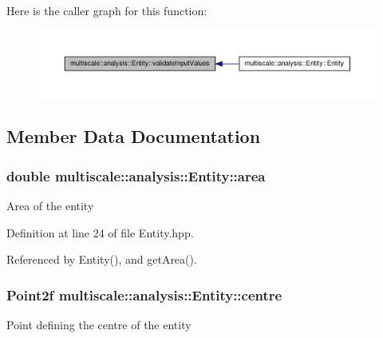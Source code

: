 \-Here is the caller graph for this function\-:\nopagebreak
\begin{figure}[H]
\begin{center}
\leavevmode
\includegraphics[width=350pt]{classmultiscale_1_1analysis_1_1Entity_afd09bf78874eb411c0940713948c4891_icgraph}
\end{center}
\end{figure}




\subsection{\-Member \-Data \-Documentation}
\hypertarget{classmultiscale_1_1analysis_1_1Entity_a7fad3c67bb46cc0f4ce1fb17ef3e66cc}{
\subsubsection[{area}]{\setlength{\rightskip}{0pt plus 5cm}double {\bf multiscale\-::analysis\-::\-Entity\-::area}}}\label{classmultiscale_1_1analysis_1_1Entity_a7fad3c67bb46cc0f4ce1fb17ef3e66cc}
\-Area of the entity 

\-Definition at line 24 of file \-Entity.\-hpp.



\-Referenced by \-Entity(), and get\-Area().

\hypertarget{classmultiscale_1_1analysis_1_1Entity_ad226609174b21f71210161d29a16d4ef}{
\subsubsection[{centre}]{\setlength{\rightskip}{0pt plus 5cm}\-Point2f {\bf multiscale\-::analysis\-::\-Entity\-::centre}}}\label{classmultiscale_1_1analysis_1_1Entity_ad226609174b21f71210161d29a16d4ef}
\-Point defining the centre of the entity 

